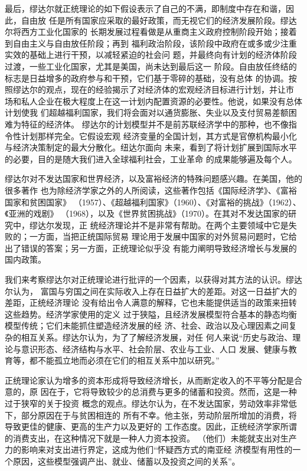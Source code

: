 最后，缪达尔就正统理论的如下假设表示了自己的不满，即制度中存在和谐，因此，自由放
任是所有国家应采取的最好政策，而无视它们的经济发展阶段。缪达尔将西方工业化国家的
长期发展过程看做是从重商主义政府控制阶段开始；接着到自由主义与自由放任阶段；再到
福利政治阶段，该阶段中政府在或多或少注重实效的基础上进行干预，以减轻紧迫的社会问
题，并最终向有计划的经济体阶段过渡，一些工业化国家，尤其是美国，尚未达到最后这一
阶段。自由放任终结的标志是日益增多的政府参与和干预，它们基于零碎的基础，没有总体
的协调。按照缪达尔的观点，现在的经验揭示了对经济体的宏观经济目标进行计划，并让市
场和私人企业在极大程度上在这一计划内配置资源的必要性。他说，如果没有总体计划使我
们超越福利国家，我们将会面对以通货膨胀、失业以及支付贸易差额困难为特征的经济体。
缪达尔的计划模型并不是前苏联经济学中的那种，也不像指令性计划那样完全。它假设宏观
经济变量的全国计划，其方式是官僚机构最小化与经济决策制定的最大分散化。纽达尔面向
未来，看到了将计划扩展到国际水平的必要，目的是随大我们进入全球福利社会，工业革命
的成果能够遍及每个人。

缪达尔对不发达国家和世界经济，以及富裕经济的特殊问题感兴趣。在美国，他的很多著作
也为除经济学家之外的人所阅读，这些著作包括《国际经济学》、《富裕国家和贫困国家》
（1957）、《超越福利国家》（1960）、《对富裕的挑战》（1962）、《亚洲的戏剧》
（1968），以及《世界贫困挑战》（1970）。在其对不发达国家的研究中，缪达尔发现，正
统经济理论并不是非常有帮助。在两个主要领域中它是失败的；一方面，当把正统国际贸易
理论用于发展中国家的对外贸易问题时，它给出了错误的答案；另一方面，正统理论似乎没
有能力阐明导致经济增长与发展的国内政策。

我们来考察缪达尔对正统理论进行批评的一个因素，以获得对其方法的认识。缪达尔认为，
富国与穷国之间在实际收入上存在日益扩大的差距。对这一日益扩大的差距，正统经济理论
没有给出令人满意的解释，它也未能提供适当的政策来扭转这些趋势。经济学家使用的定义
过于狭隘，且经济发展模型符合基本的静态均衡模型传统；它们未能抓住塑造经济发展的经
济、社会、政治以及心理因素之间复杂的相互关系。缪达尔认为，为了了解经济发展，对任
何人来说“历史与政治、理论与意识形态、经济结构与水平、社会阶层、农业与工业、人口
发展、健康与教育等，都不能孤立地而必须在它们的相互关系中加以研究。”

正统理论家认为增多的资本形成将导致经济增长，从而断定收入的不平等分配是合意的，原
因在于，它将导致较少的总消费与更多的储蓄和投资。然而，这是一种过于狭窄的关于投资
概念的观点。缪达尔认为，在不发达国家，劳动效率非常低下，部分原因在于与贫困相连的
所有不幸。他主张，劳动阶层所增加的消费，将导致更佳的健康、更高的生产力以及更好的
工作态度。因此，正统经济学家所谓的消费支出，在这种情况下就是一种人力资本投资。
（他们）未能就支出对生产力的影响来对支出进行界定，这成为他们“怀疑西方式的南亚经
济模型有用性的一个原因，这些模型强调产出、就业、储蓄以及投资之间的关系”。

